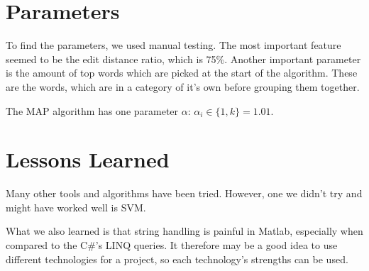 \documentclass[a4paper, 11pt]{article}
\begin{document}
\section{Parameters}
To find the parameters, we used manual testing. The most important feature seemed to be the edit distance ratio, which is 75\%. Another important parameter is the amount of top words which are picked at the start of the algorithm. These are the words, which are in a category of it's own before grouping them together.

The MAP algorithm has one parameter $\alpha$: $\alpha_i \in \lbrace1, k \rbrace = 1.01$.

\section{Lessons Learned}
Many other tools and algorithms have been tried. However, one we didn't try and might have worked well is SVM.

What we also learned is that string handling is painful in Matlab, especially when compared to the C\#'s LINQ queries. It therefore may be a good idea to use different technologies for a project, so each technology's strengths can be used.
\end{document}
